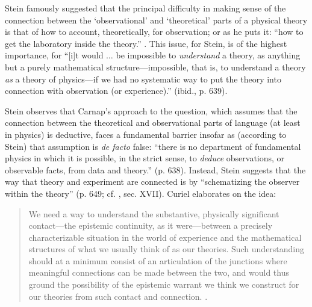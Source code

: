 \documentclass[12pt,english,twoside]{article}
\numberwithin{equation}{section}
\begin{document}
Stein famously suggested that the principal difficulty in making sense of the connection between the `observational' and `theoretical' parts of a physical theory is that of how to account, theoretically, for observation; or as he puts it: ``how to get the laboratory inside the theory.'' \citep[p. 638]{stein1994}. This issue, for Stein, is of the highest importance, for ``[i]t would $\dots$ be impossible to \emph{understand} a theory, as anything but a purely mathematical structure---impossible, that is, to understand a theory \emph{as} a theory of physics---if we had no systematic way to put the theory into connection with observation (or experience).'' (ibid., p. 639).

Stein observes that Carnap's approach to the question, which assumes that the connection between the theoretical and observational parts of language (at least in physics) is deductive, faces a fundamental barrier insofar as (according to Stein) that assumption is \emph{de facto} false: ``there is no department of fundamental physics in which it is possible, in the strict sense, to \emph{deduce} observations, or observable facts, from data and theory.'' (p. 638). Instead, Stein suggests that the way that theory and experiment are connected is by ``schematizing the observer within the theory'' (p. 649; cf. \citealt{stein1972}, sec. XVII). Curiel elaborates on the idea:

\begin{quote}
  We need a way to understand the substantive, physically significant contact---the epistemic continuity, as it were---between a precisely characterizable situation in the world of experience and the mathematical structures of what we usually think of as our theories. Such understanding should at a minimum consist of an articulation of the junctions where meaningful connections can be made between the two, and would thus ground the possibility of the epistemic warrant we think we construct for our theories from such contact and connection. \citep[p. 6]{curiel2020}.
\end{quote}
\end{document}
